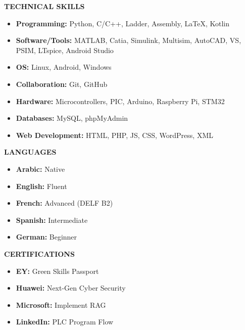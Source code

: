 \documentclass{article}
\begin{document}
\begin{minipage}[t]{0.3\textwidth}
\raggedright
{\color{sectionteal}\large\bfseries TECHNICAL SKILLS} \\[0.05em]
\begin{itemize}[leftmargin=*, noitemsep, topsep=0pt, partopsep=0pt, parsep=0pt]
\item \textbf{Programming:} Python, C/C++, Ladder, Assembly, LaTeX, Kotlin \\[0.5em]
\item \textbf{Software/Tools:} MATLAB, Catia, Simulink, Multisim, AutoCAD, VS, PSIM, LTspice, Android Studio \\[0.5em]
\item \textbf{OS:} Linux, Android, Windows \\[0.5em]
\item \textbf{Collaboration:} Git, GitHub \\[0.5em]
\item \textbf{Hardware:} Microcontrollers, PIC, Arduino, Raspberry Pi, STM32 \\[0.5em]
\item \textbf{Databases:} MySQL, phpMyAdmin \\[0.5em]
\item \textbf{Web Development:} HTML, PHP, JS, CSS, WordPress, XML
\end{itemize}

\vspace{1.5em}
{\color{sectionteal}\large\bfseries LANGUAGES} \\[0.05em]
\begin{itemize}[leftmargin=*, noitemsep, topsep=0pt, partopsep=0pt, parsep=0pt]
\item \textbf{Arabic:} Native \\[0.5em]
\item \textbf{English:} Fluent \\[0.5em]
\item \textbf{French:} Advanced (DELF B2) \\[0.5em]
\item \textbf{Spanish:} Intermediate \\[0.5em]
\item \textbf{German:} Beginner
\end{itemize}

\vspace{1.5em}
{\color{sectionteal}\large\bfseries CERTIFICATIONS} \\[0.05em]
\begin{itemize}[leftmargin=*, noitemsep, topsep=0pt, partopsep=0pt, parsep=0pt]
\item \textbf{EY:} Green Skills Passport \\[0.5em]
\item \textbf{Huawei:} Next-Gen Cyber Security \\[0.5em]
\item \textbf{Microsoft:} Implement RAG \\[0.5em]
\item \textbf{LinkedIn:} PLC Program Flow
\end{itemize}


\end{minipage}
\end{document}
